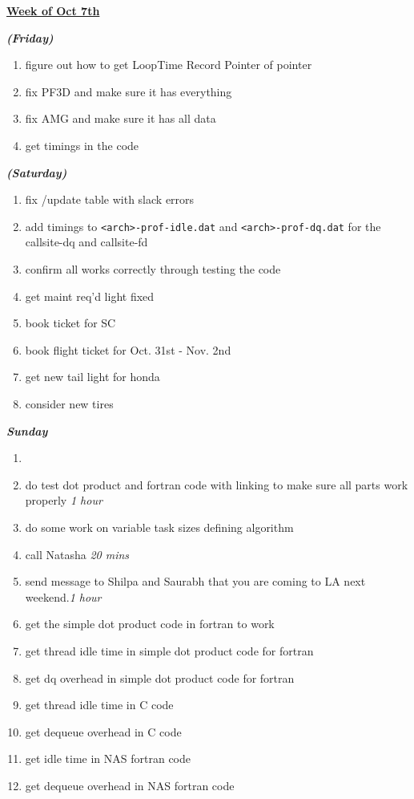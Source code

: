 \documentclass[11pt]{article}
\newcommand{\timeEst}[1]{\textit{#1}}
\begin{document}
\underline{\textbf{Week of Oct 7th}}

\textbf{\textit{(Friday)}}
\begin{enumerate}
\item figure out how to get LoopTime Record Pointer of pointer
\item fix PF3D and make sure it has everything
\item fix AMG and make sure it has all data
\item get timings in the code
\end{enumerate}


\textbf{\textit{(Saturday)}}
\begin{enumerate}
\item fix /update table with slack errors
\item add timings to \texttt{<arch>-prof-idle.dat} and \texttt{<arch>-prof-dq.dat} for the callsite-dq and callsite-fd
\item confirm all works correctly through testing the code
\item get maint req'd light fixed
\item book ticket for SC
\item book flight ticket for Oct. 31st - Nov. 2nd
\item get new tail light for honda
\item consider new tires
\end{enumerate}

\textbf{\textit{Sunday}}
\begin{enumerate}
\item
\item do test dot product and fortran code with linking to make sure all parts work properly  \timeEst{1 hour}
\item do some work on variable task sizes defining algorithm
\item call Natasha \timeEst{20 mins}
\item send message to Shilpa and Saurabh that you are coming to LA next weekend.\timeEst{1 hour}

\item get the simple dot product code in fortran to work

\item get thread idle time in simple dot product code for fortran


\item get dq overhead in simple dot product code for fortran


\item get thread idle time in C code
\item get dequeue overhead in C code
\item get idle time in NAS fortran code
\item get dequeue overhead in NAS fortran code

\end{enumerate}
\end{document}
